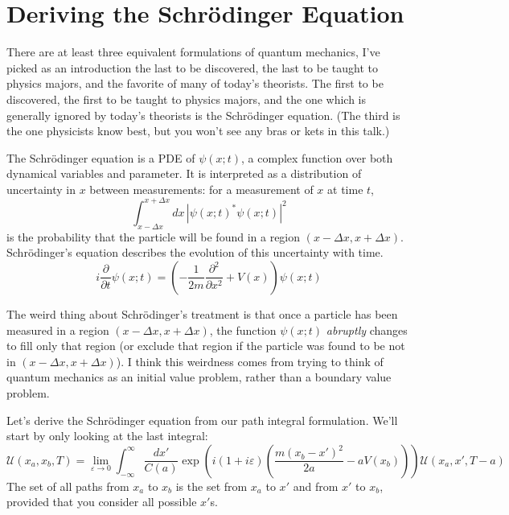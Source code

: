 \documentclass[12pt]{article}
\begin{document}
\section{Deriving the Schr\"odinger Equation}

\label{sec:schrodinger}

There are at least three equivalent formulations of quantum mechanics,
I've picked as an introduction the last to be discovered, the last to
be taught to physics majors, and the favorite of many of today's
theorists.  The first to be discovered, the first to be taught to
physics majors, and the one which is generally ignored by today's
theorists is the Schr\"odinger equation.  (The third is the one
physicists know best, but you won't see any bras or kets in this
talk.)

The Schr\"odinger equation is a PDE of $\psi(x;t)$, a complex function
over both dynamical variables and parameter.  It is interpreted as a
distribution of uncertainty in $x$ between measurements: for a
measurement of $x$ at time $t$,
\begin{equation} 
  \int_{x-\Delta x}^{x+\Delta x} dx \, |\psi(x;t)^* \psi(x;t)|^2
\end{equation}
is the probability that the particle will be found in a region
$(x-\Delta x, x+\Delta x)$.  Schr\"odinger's equation describes the
evolution of this uncertainty with time.
\begin{equation}
  i \frac{\partial}{\partial t} \psi(x;t) = \left(
  -\frac{1}{2 m} \frac{\partial^2}{\partial x^2} + V(x) \right)
  \psi(x;t)
  \label{eqn:schrodinger}
\end{equation}

The weird thing about Schr\"odinger's treatment is that once a
particle has been measured in a region $(x-\Delta x, x+\Delta x)$, the
function $\psi(x;t)$ {\it abruptly} changes to fill only that region
(or exclude that region if the particle was found to be not in
$(x-\Delta x, x+\Delta x)$).  I think this weirdness comes from trying
to think of quantum mechanics as an initial value problem, rather than
a boundary value problem.

Let's derive the Schr\"odinger equation from our path integral
formulation.  We'll start by only looking at the last integral:
\begin{equation}
  \mathcal{U}(x_a, x_b, T) = \lim_{\varepsilon \to 0} \int_{-\infty}^\infty \frac{dx'}{C(a)}
  \exp \left(i (1 + i\varepsilon) \left(\frac{m(x_b - x')^2}{2 a} -
  aV(x_b) \right) \right) \mathcal{U}(x_a, x', T - a)
\end{equation}
The set of all paths from $x_a$ to $x_b$ is the set from $x_a$ to $x'$
and from $x'$ to $x_b$, provided that you consider all possible $x'$s.
\end{document}
